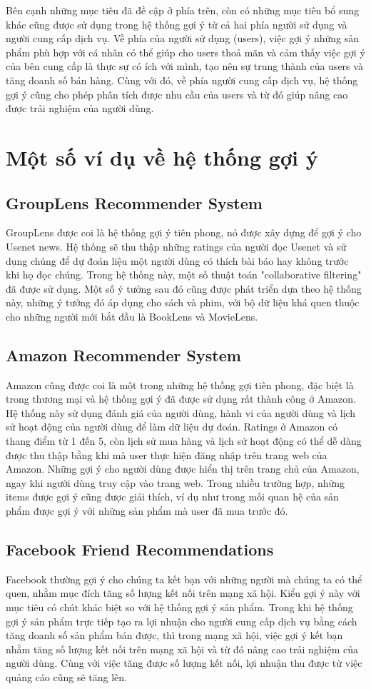 \documentclass[14pt]{article}
\begin{document}
	Bên cạnh những mục tiêu đã đề cập ở phía trên, còn có những mục tiêu bổ sung khác cũng được sử dụng trong hệ thống gợi ý từ cả hai phía người sử dụng và người cung cấp dịch vụ. Về phía của người sử dụng (users), việc gợi ý những sản phẩm phù hợp với cá nhân có thể giúp cho users thoả mãn và cảm thấy việc gợi ý của bên cung cấp là thực sự có ích với mình, tạo nên sự trung thành của users và tăng doanh số bán hàng. Cùng với đó, về phía người cung cấp dịch vụ, hệ thống gợi ý cũng cho phép phân tích được nhu cầu của users và từ đó giúp nâng cao được trải nghiệm của người dùng.
	
	\section{Một số ví dụ về hệ thống gợi ý}	
		\subsection{GroupLens Recommender System}
		GroupLens được coi là hệ thống gợi ý tiên phong, nó được xây dựng để gợi ý cho Usenet news. Hệ thống sẽ thu thập những ratings của người đọc Usenet và sử dụng chúng để dự đoán liệu một người dùng có thích bài báo hay không trước khi họ đọc chúng. Trong hệ thống này, một số thuật toán "collaborative filtering" đã được sử dụng. Một số ý tưởng sau đó cũng được phát triển dựa theo hệ thống này, những ý tưởng đó áp dụng cho sách và phim, với bộ dữ liệu khá quen thuộc cho những người mới bắt đầu là BookLens và MovieLens.
		\subsection{Amazon Recommender System}
		Amazon cũng được coi là một trong những hệ thống gợi tiên phong, đặc biệt là trong thương mại và hệ thống gợi ý đã được sử dụng rất thành công ở Amazon. Hệ thống này sử dụng đánh giá của người dùng, hành vi của người dùng và lịch sử hoạt động của người dùng để làm dữ liệu dự đoán. Ratings ở Amazon có thang điểm từ 1 đến 5, còn lịch sử mua hàng và lịch sử hoạt động có thể dễ dàng được thu thập bằng khi mà user thực hiện đăng nhập trên trang web của Amazon. Những gợi ý cho người dùng được hiển thị trên trang chủ của Amazon, ngay khi người dùng truy cập vào trang web. Trong nhiều trường hợp, những items được gợi ý cũng được giải thích, ví dụ như trong mối quan hệ của sản phẩm được gợi ý với những sản phẩm mà user đã mua trước đó.
		\subsection{Facebook Friend Recommendations}
		Facebook thường gợi ý cho chúng ta kết bạn với những người mà chúng ta có thể quen, nhằm mục đích tăng số lượng kết nối trên mạng xã hội. Kiểu gợi ý này với mục tiêu có chút khác biệt so với hệ thống gợi ý sản phẩm. Trong khi hệ thống gợi ý sản phẩm trực tiếp tạo ra lợi nhuận cho người cung cấp dịch vụ bằng cách tăng doanh số sản phẩm bán được, thì trong mạng xã hội, việc gợi ý kết bạn nhằm tăng số lượng kết nối trên mạng xã hội và từ đó nâng cao trải nghiệm của người dùng. Cùng với việc tăng được số lượng kết nối, lợi nhuận thu được từ việc quảng cáo cũng sẽ tăng lên.
	
	
	
	
	
\end{document}
